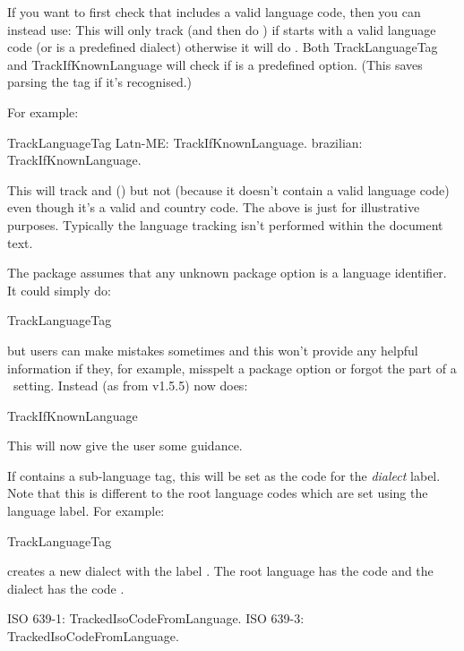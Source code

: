\documentclass[titlepage=false,oneside,
 fontsize=12pt,captions=tableheading]{scrbook}
\begin{document}
If you want to first check that  includes a valid language
code, then you can instead use:
This will only track  (and then do ) if
 starts with a valid language code (or is a predefined
dialect) otherwise it will do . Both
\gls{TrackLanguageTag} and \gls{TrackIfKnownLanguage} will check if
 is a predefined option. (This saves parsing the tag if
it's recognised.)

For example:
\begin{codebox}
\gls{TrackLanguageTag}
Latn-ME: \gls{TrackIfKnownLanguage}.
brazilian: \gls{TrackIfKnownLanguage}.
\end{codebox}
This will track  and 
() but not  (because it doesn't contain a
valid language code) even though it's a valid  and country
code. The above is just for illustrative purposes. Typically the
language tracking isn't performed within the document text.

The  package assumes that any unknown package option is a
language identifier. It could simply do:
\begin{compactcodebox}
\gls{TrackLanguageTag}
\end{compactcodebox}
but users can make mistakes sometimes and this won't provide any
helpful information if they, for example, misspelt a package option
or forgot the  part of a \keyval\
setting. Instead (as from v1.5.5)  now does:
\begin{compactcodebox}
\gls{TrackIfKnownLanguage}
\end{compactcodebox}
This will now give the user some guidance. 

If  contains a sub-language tag, this will be set
as the  code for the \emph{dialect} label. Note that this is
different to the root language codes which are set using the
language label. For example:
\begin{codebox}
\gls{TrackLanguageTag}
\end{codebox}
creates a new dialect with the label .
The root language  has the  code
 and the dialect \code{zh\-cmn\-Hans\-CN} has the
 code .
\begin{codebox}
ISO 639-1: \gls{TrackedIsoCodeFromLanguage}.
ISO 639-3: \gls{TrackedIsoCodeFromLanguage}\marg{639-3}.
\end{codebox}
\end{document}
